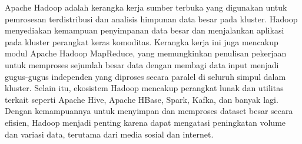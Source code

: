 Apache Hadoop adalah kerangka kerja sumber terbuka yang digunakan untuk pemrosesan terdistribusi dan analisis himpunan data besar pada kluster. Hadoop menyediakan kemampuan penyimpanan data besar dan menjalankan aplikasi pada kluster perangkat keras komoditas. Kerangka kerja ini juga mencakup modul Apache Hadoop MapReduce, yang memungkinkan penulisan pekerjaan untuk memproses sejumlah besar data dengan membagi data input menjadi gugus-gugus independen yang diproses secara paralel di seluruh simpul dalam kluster. Selain itu, ekosistem Hadoop mencakup perangkat lunak dan utilitas terkait seperti Apache Hive, Apache HBase, Spark, Kafka, dan banyak lagi. Dengan kemampuannya untuk menyimpan dan memproses dataset besar secara efisien, Hadoop menjadi penting karena dapat mengatasi peningkatan volume dan variasi data, terutama dari media sosial dan internet.